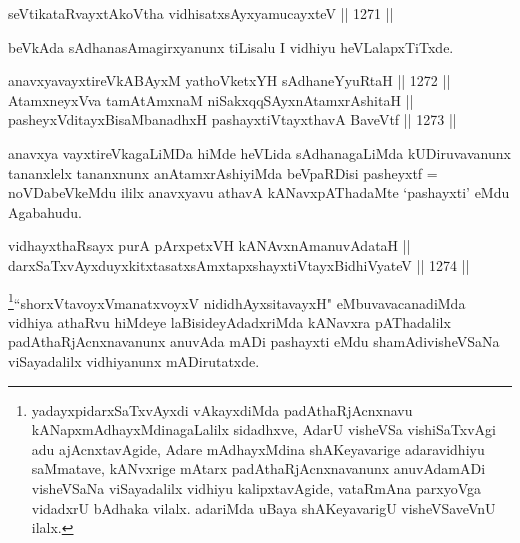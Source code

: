 \begin{shl}
seVtikataRvayxtAkoV\s tha vidhisatxsAyxyamucayxteV \hfill || 1271 ||  
\end{shl}

\begin{artha}
beVkAda sAdhanasAmagirxyanunx tiLisalu I vidhiyu heVLalapxTiTxde.
\end{artha}

\begin{shl}
anavxyavayxtireVkABAyxM yathoVketxYH sAdhaneYyuRtaH \hfill || 1272 ||  \\
AtamxneyxVva tamAtAmxnaM niSakxqqSAyxnAtamxrAshitaH ||  \\
pasheyxVditayxBisaMbanadhxH pashayxtiVtayxthavA BaveVtf \hfill || 1273 ||  
\end{shl}

\begin{artha}
anavxya vayxtireVkagaLiMDa hiMde heVLida sAdhanagaLiMda kUDiruvavanunx tananxlelx tananxnunx anAtamxrAshiyiMda beVpaRDisi pasheyxtf = noVDabeVkeMdu ililx anavxyavu athavA kANavxpAThadaMte `pashayxti' eMdu Agabahudu.
\end{artha}


\begin{shl}
vidhayxthaRsayx purA pArxpetxVH kANAvxnAmanuvAdataH || \\
darxSaTxvAyxduyxkitxtasatxsAmxtapxshayxtiVtayxBidhiVyateV \hfill || 1274 ||  
\end{shl}

\begin{artha}
\footnote{yadayxpidarxSaTxvAyxdi vAkayxdiMda padAthaRjAcnxnavu kANapxmAdhayxMdinagaLalilx sidadhxve, AdarU visheVSa vishiSaTxvAgi adu ajAcnxtavAgide, Adare mAdhayxMdina shAKeyavarige adaravidhiyu saMmatave, kANvxrige mAtarx padAthaRjAcnxnavanunx anuvAdamADi visheVSaNa viSayadalilx vidhiyu kalipxtavAgide, vataRmAna parxyoVga vidadxrU bAdhaka vilalx. adariMda uBaya shAKeyavarigU visheVSaveVnU ilalx.}``shorxVtavoyxVmanatxvoyxV nididhAyxsitavayxH" eMbuvavacanadiMda vidhiya athaRvu hiMdeye laBisideyAdadxriMda kANavxra pAThadalilx padAthaRjAcnxnavanunx anuvAda mADi pashayxti eMdu shamAdivisheVSaNa viSayadalilx vidhiyanunx mADirutatxde. 
\end{artha}



